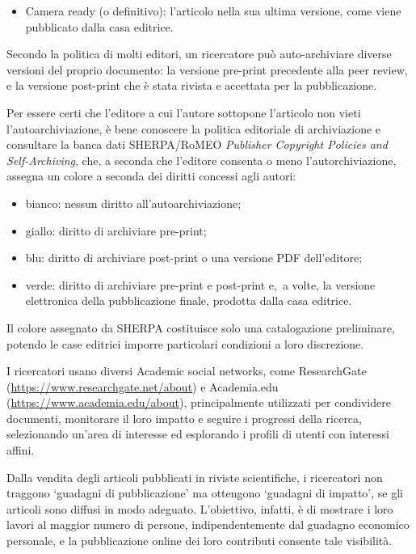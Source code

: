 \begin{itemize}
\item
  Camera ready (o definitivo): l'articolo nella sua ultima versione,
  come viene pubblicato dalla casa editrice.
\end{itemize}

Secondo la politica di molti editori, un ricercatore può auto-archiviare
diverse versioni del proprio documento: la versione pre-print precedente
alla peer review, e la versione post-print che è stata rivista e
accettata per la pubblicazione.

Per essere certi che l'editore a cui l'autore sottopone l'articolo non
vieti l'autoarchiviazione, è bene conoscere la politica editoriale di
archiviazione e consultare la banca dati SHERPA/RoMEO \emph{Publisher
Copyright Policies and Self-Archiving}, che, a seconda che l'editore
consenta o meno l'autorchiviazione, assegna un colore a seconda dei
diritti concessi agli autori:

\begin{itemize}
\item
  bianco: nessun diritto all'autoarchiviazione;
\item
  giallo: diritto di archiviare pre-print;
\item
  blu: diritto di archiviare post-print o una versione PDF dell'editore;
\item
  verde: diritto di archiviare pre-print e post-print e,~a volte, la
  versione elettronica della pubblicazione finale, prodotta dalla casa
  editrice.
\end{itemize}

Il colore assegnato da SHERPA costituisce solo una catalogazione
preliminare, potendo le case editrici imporre particolari condizioni a
loro discrezione.

I ricercatori usano diversi Academic social networks, come ResearchGate
(\url{https://www.researchgate.net/about})
e Academia.edu
(\url{https://www.academia.edu/about}),
principalmente utilizzati per condividere documenti, monitorare il loro
impatto e seguire i progressi della ricerca, selezionando un'area di
interesse ed esplorando i profili di utenti con interessi affini.

Dalla vendita degli articoli pubblicati in riviste scientifiche, i
ricercatori non traggono `guadagni di pubblicazione' ma ottengono
`guadagni di impatto', se gli articoli sono diffusi in modo adeguato.
L'obiettivo, infatti, è di mostrare i loro lavori al maggior numero di
persone, indipendentemente dal guadagno economico personale, e la
pubblicazione online dei loro contributi consente tale visibilità.

